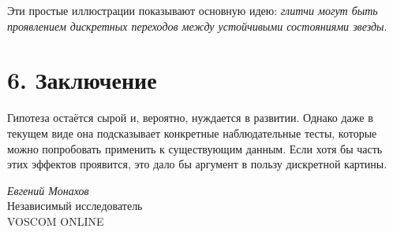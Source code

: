 \documentclass[a4paper,12pt]{article}
\begin{document}
Эти простые иллюстрации показывают основную идею: \textit{глитчи могут быть проявлением дискретных переходов между устойчивыми состояниями звезды}.

\section*{6. Заключение}
Гипотеза остаётся сырой и, вероятно, нуждается в развитии. Однако даже в текущем виде она подсказывает конкретные наблюдательные тесты, которые можно попробовать применить к существующим данным. Если хотя бы часть этих эффектов проявится, это дало бы аргумент в пользу дискретной картины.

\vspace{2em}
\noindent
\textit{Евгений Монахов} \\
Независимый исследователь \\
VOSCOM ONLINE
\end{document}
